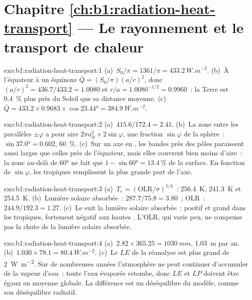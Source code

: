 \section*{Chapitre \ref{ch:b1:radiation-heat-transport} --- Le rayonnement et le transport de chaleur}

\begin{solution}{exo:b1:radiation-heat-transport:1}
(a)~$S_0/\pi = 1361/\pi = \qty{433.2}{W.m^{-2}}$. (b)~À l'équateur à un équinoxe
$\bar Q = (S_0/\pi)(a/r)^2$, donc $(a/r)^2 = 436.7/433.2 = 1.0080$ et $r/a =
1.0080^{-1/2} = 0.9960$~: la Terre est \qty{0.4}{\percent} plus près du Soleil que
sa distance moyenne. (c)~$\bar Q = 433.2 \times 0.9683 \times \cos\ang{23.44} =
\qty{384.9}{W.m^{-2}}$.
\end{solution}

\begin{solution}{exo:b1:radiation-heat-transport:2}
(a)~$415.6/172.4 = 2.41$. (b)~La zone entre les parallèles $\pm\varphi$ a pour
aire $2\pi a_\oplus^2 \times 2\sin\varphi$, une fraction $\sin\varphi$ de la sphère~:
$\sin\ang{37.0} = 0.602$, \qty{60}{\percent}. (c)~Sur un axe en , les
bandes près des pôles paraissent aussi larges que celles près de l'équateur, mais elles couvrent bien
moins d'aire~: la zone au-delà de \ang{60} ne fait que $1 - \sin\ang{60} =
\qty{13.4}{\percent}$ de la surface. En fonction de $\sin\varphi$, les tropiques remplissent la plus grande part
de l'axe.
\end{solution}

\begin{solution}{exo:b1:radiation-heat-transport:3}
(a)~$T_e = (\text{OLR}/\sigma)^{1/4}$~: \qty{256.4}{K}, \qty{241.3}{K} et
\qty{254.5}{K}. (b)~Lumière solaire absorbée~: $287.7/75.8 = 3.80$~; OLR~: $244.9/192.3 =
1.27$. (c)~Le  suit la lumière solaire absorbée~: positif et grand dans les
tropiques, fortement négatif aux hautes . L'OLR, qui varie peu, ne
compense pas la chute de la lumière solaire absorbée.
\end{solution}

\begin{solution}{exo:b1:radiation-heat-transport:4}
(a)~$2.82 \times 365.25 = \qty{1030}{mm}$, \qty{1.03}{m} par an. (b)~$1.030 \times
78.1 = \qty{80.4}{W.m^{-2}}$.
(c)~Le $LE$ de la réanalyse est plus grand de \qty{2}{W.m^{-2}}. Sur de nombreuses années
l'atmosphère ne peut continuer d'accumuler de la vapeur d'eau~: toute l'eau évaporée retombe,
donc $LE$ et $LP$ doivent être égaux en moyenne globale. La différence est
un déséquilibre du modèle, comme son déséquilibre radiatif.
\end{solution}

